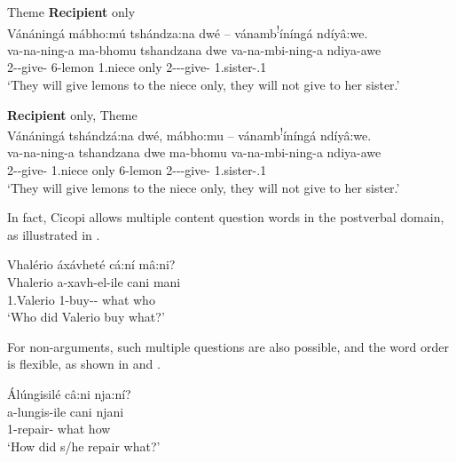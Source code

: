 \documentclass[output=paper]{langscibook}
\begin{document}
\z
\z

\ea\label{bkm:Ref121149097}
\ea
\label{bkm:Ref121149097:a}
Theme \textbf{Recipient} only\\
Vánáningá mábho:mú tshándza:na dwé -- vánamb\textsuperscript{!}íníngá ndíyâ:we.\\
\gll
va-na-ning-a  ma-bhomu  tshandzana  dwe     va-na-mbi-ning-a  ndiya-awe\\
2\SM{}-\FUT{}-give-\FV{}  6-lemon  1.niece  only  2\SM{}-\FUT{}-\NEG{}-give-\FV{}  1.sister-\POSS{}.1\\
\glt
‘They will give lemons to the niece only, they will not give to her sister.’


\ex
\label{bkm:Ref121149097:b}
\textbf{Recipient} only, Theme\\
Vánáningá tshándzá:na dwé, mábho:mu -- vánamb\textsuperscript{!}íníngá ndíyâ:we.\\
\gll
va-na-ning-a  tshandzana  dwe  ma-bhomu    va-na-mbi-ning-a  ndiya-awe\\
2\SM{}-\FUT{}-give-\FV{}  1.niece  only  6-lemon 2\SM{}-\FUT{}-\NEG{}-give-\FV{}  1.sister-\POSS{}.1\\
\glt
‘They will give lemons to the niece only, they will not give to her sister.’

\z
\z

In fact, Cicopi allows multiple content question words in the postverbal domain, as illustrated in .
\pagebreak

\ea
\label{bkm:Ref122338299}
Vhalério áxávheté cá:ní mâ:ni?\\
\gll
Vhalerio  a-xavh-el-ile  cani  mani\\
1.Valerio  1\SM{}-buy-\APPL{}-\PFV{}  what  who\\
\glt
‘Who did Valerio buy what?’\\

\z

For non-arguments, such multiple questions are also possible, and the word order is flexible, as shown in  and .

\ea\label{bkm:Ref141356914}
\ea
Álúngisilé câ:ni nja:ní?\\
\gll
a-lungis-ile  cani  njani\\
1\SM{}-repair-\PFV{}  what  how\\
\glt
‘How did s/he repair what?’\\
\end{document}
